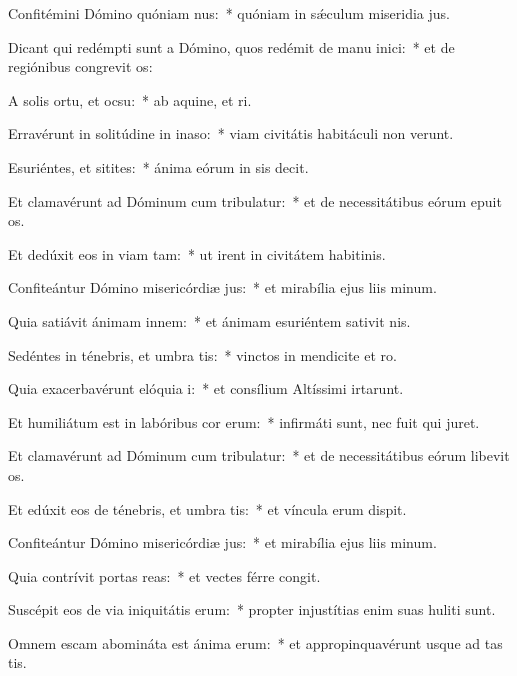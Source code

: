 \item Confitémini Dómino quóniam nus:~* quóniam in sǽculum miseridia jus.
\item Dicant qui redémpti sunt a Dómino, quos redémit de manu inici:~* et de regiónibus congrevit os:
\item A solis ortu, et ocsu:~* ab aquine, et ri.
\item Erravérunt in solitúdine in inaso:~* viam civitátis habitáculi non verunt.
\item Esuriéntes, et sitites:~* ánima eórum in sis decit.
\item Et clamavérunt ad Dóminum cum tribulatur:~* et de necessitátibus eórum epuit os.
\item Et dedúxit eos in viam tam:~* ut irent in civitátem habitinis.
\item Confiteántur Dómino misericórdiæ jus:~* et mirabília ejus liis minum.
\item Quia satiávit ánimam innem:~* et ánimam esuriéntem sativit nis.
\item Sedéntes in ténebris, et umbra tis:~* vinctos in mendicite et ro.
\item Quia exacerbavérunt elóquia i:~* et consílium Altíssimi irtarunt.
\item Et humiliátum est in labóribus cor erum:~* infirmáti sunt, nec fuit qui juret.
\item Et clamavérunt ad Dóminum cum tribulatur:~* et de necessitátibus eórum libevit os.
\item Et edúxit eos de ténebris, et umbra tis:~* et víncula erum dispit.
\item Confiteántur Dómino misericórdiæ jus:~* et mirabília ejus liis minum.
\item Quia contrívit portas reas:~* et vectes férre congit.
\item Suscépit eos de via iniquitátis erum:~* propter injustítias enim suas huliti sunt.
\item Omnem escam abomináta est ánima erum:~* et appropinquavérunt usque ad tas tis.
